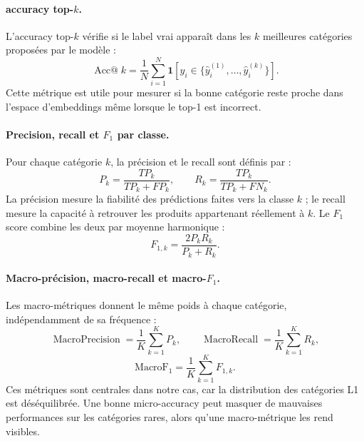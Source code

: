 \documentclass[12pt,a4paper]{report}
\begin{document}
\paragraph{accuracy top-$k$.}
L'accuracy top-$k$ vérifie si le label vrai apparaît dans les $k$ meilleures catégories proposées par le modèle :
\begin{equation}
    \operatorname{Acc@}k
    =
    \frac{1}{N}
    \sum_{i=1}^{N}
    \mathbf{1}\left[y_i \in \{\hat{y}_i^{(1)},\ldots,\hat{y}_i^{(k)}\}\right].
\end{equation}
Cette métrique est utile pour mesurer si la bonne catégorie reste proche dans l'espace d'embeddings même lorsque le top-1 est incorrect.

\paragraph{Precision, recall et $F_1$ par classe.}
Pour chaque catégorie $k$, la précision et le recall sont définis par :
\begin{equation}
    P_k
    =
    \frac{TP_k}{TP_k+FP_k},
    \qquad
    R_k
    =
    \frac{TP_k}{TP_k+FN_k}.
\end{equation}
La précision mesure la fiabilité des prédictions faites vers la classe $k$ ; le recall mesure la capacité à retrouver les produits appartenant réellement à $k$. Le $F_1$ score combine les deux par moyenne harmonique :
\begin{equation}
    F_{1,k}
    =
    \frac{2P_kR_k}{P_k+R_k}.
\end{equation}

\paragraph{Macro-précision, macro-recall et macro-$F_1$.}
Les macro-métriques donnent le même poids à chaque catégorie, indépendamment de sa fréquence :
\begin{equation}
    \operatorname{MacroPrecision}
    =
    \frac{1}{K}\sum_{k=1}^{K}P_k,
    \qquad
    \operatorname{MacroRecall}
    =
    \frac{1}{K}\sum_{k=1}^{K}R_k,
\end{equation}
\begin{equation}
    \operatorname{MacroF_1}
    =
    \frac{1}{K}\sum_{k=1}^{K}F_{1,k}.
\end{equation}
Ces métriques sont centrales dans notre cas, car la distribution des catégories L1 est déséquilibrée. Une bonne micro-accuracy peut masquer de mauvaises performances sur les catégories rares, alors qu'une macro-métrique les rend visibles.
\end{document}
